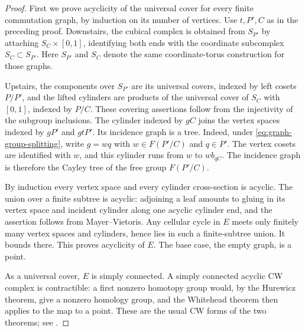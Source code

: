 \begin{proof}
First we prove acyclicity of the universal cover for every finite
commutation graph, by induction on its number of vertices.  Use
$t,P',C$ as in the preceding proof.  Downstairs, the cubical complex
is obtained from $S_{P'}$ by attaching
$S_C\times[0,1]$, identifying both ends with the coordinate
subcomplex $S_C\subset S_{P'}$.  Here $S_{P'}$ and $S_C$ denote the
same coordinate-torus construction for those graphs.

Upstairs, the components over $S_{P'}$ are its universal covers,
indexed by left cosets $P/P'$, and the lifted cylinders are products
of the universal cover of $S_C$ with $[0,1]$, indexed by $P/C$.
These covering assertions follow from the injectivity of the
subgroup inclusions.  The cylinder indexed by $gC$ joins the vertex
spaces indexed by $gP'$ and $gtP'$.  Its incidence graph is a tree.
Indeed, under \eqref{eq:graph-group-splitting}, write $g=wq$ with
$w\in F(P'/C)$ and $q\in P'$.  The vertex cosets are identified with
$w$, and this cylinder runs from $w$ to $wb_{qC}$.  The incidence
graph is therefore the Cayley tree of the free group $F(P'/C)$.

By induction every vertex space and every cylinder cross-section
is acyclic.  The union over a finite subtree is acyclic: adjoining
a leaf amounts to gluing in its vertex space and incident cylinder
along one acyclic cylinder end, and the assertion follows from
Mayer--Vietoris.  Any cellular cycle in $E$ meets only finitely many
vertex spaces and cylinders, hence lies in such a finite-subtree
union.  It bounds there.  This proves acyclicity of $E$.  The base
case, the empty graph, is a point.

As a universal cover, $E$ is simply connected.  A simply connected
acyclic CW complex is contractible: a first nonzero homotopy group
would, by the Hurewicz theorem, give a nonzero homology group, and
the Whitehead theorem then applies to the map to a point.  These
are the usual CW forms of the two theorems; see
\cite[Sections~4.1--4.2]{Hatcher2002}.


\end{proof}
